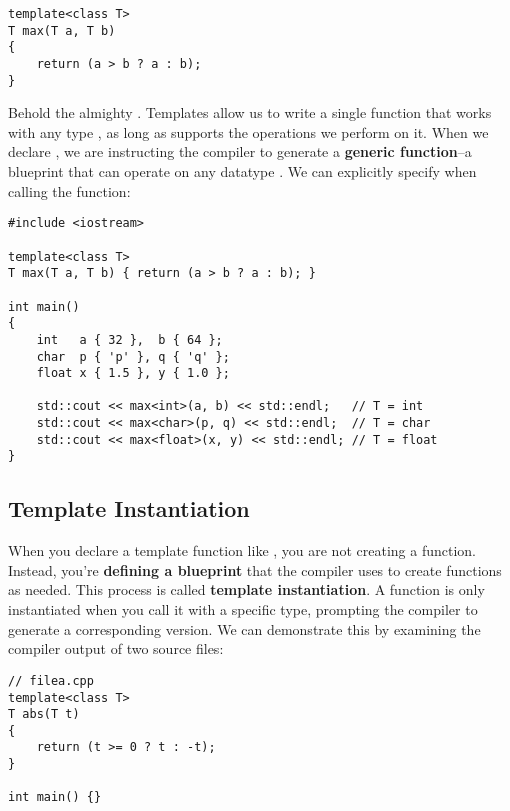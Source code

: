 \begin{lstlisting}[style=cxx]
template<class T>
T max(T a, T b)
{
    return (a > b ? a : b);
}
\end{lstlisting}

\noindent
Behold the almighty .
Templates allow us to write a single function that works with any type , as long as  supports the operations we perform on it.
When we declare , we are instructing the compiler to generate a \textbf{generic function}--a blueprint that can operate on any datatype .
We can explicitly specify  when calling the function:

\begin{lstlisting}[style=cxx]
#include <iostream>

template<class T>
T max(T a, T b) { return (a > b ? a : b); }

int main()
{
    int   a { 32 },  b { 64 };
    char  p { 'p' }, q { 'q' };
    float x { 1.5 }, y { 1.0 };

    std::cout << max<int>(a, b) << std::endl;   // T = int
    std::cout << max<char>(p, q) << std::endl;  // T = char
    std::cout << max<float>(x, y) << std::endl; // T = float
}
\end{lstlisting}


\subsection{Template Instantiation}

\noindent
When you declare a template function like , you are not creating a function.
Instead, you're \textbf{defining a blueprint} that the compiler uses to create functions as needed.
This process is called \textbf{template instantiation}.
A function is only instantiated when you call it with a specific type, prompting the compiler to generate a corresponding version.
We can demonstrate this by examining the compiler output of two source files:

\begin{lstlisting}[style=cxx]
// filea.cpp
template<class T>
T abs(T t)
{
    return (t >= 0 ? t : -t);
}

int main() {}
\end{lstlisting}

